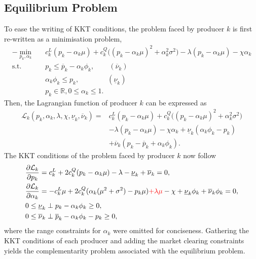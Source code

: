 \documentclass{article}
\begin{document}
\subsection*{Equilibrium Problem}
To ease the writing of KKT conditions, the problem faced by producer $k$ is first re-written as a minimisation problem,
\begin{align}
-\underset{p_k, \alpha_k}{\min} \hspace{10pt} & c_k^L(p_k - \alpha_k \mu) + c_k^Q \big((p_k - \alpha_k \mu)^2 + \alpha_k^2 \sigma^2\big) - \lambda (p_k - \alpha_k \mu) - \chi \alpha_k\\
\mbox{s.t. } & p_k \le \overline{p}_k - \alpha_k \phi_k, \hspace{25pt} (\overline{\nu}_k)\\
& \alpha_k \phi_k \le p_k, \hspace{48pt}(\underline{\nu}_k)\\
&p_k \in \mathbb{R}, 0 \le \alpha_k \le 1.
\end{align}
Then, the Lagrangian function of producer $k$ can be expressed as
\begin{align*}
\mathcal{L}_k(p_k, \alpha_k, \lambda, \chi, \underline{\nu}_k, \overline{\nu}_k) =& c_k^L(p_k - \alpha_k \mu) + c_k^Q \big((p_k - \alpha_k \mu)^2 + \alpha_k^2 \sigma^2\big)\\
&- \lambda (p_k - \alpha_k \mu) - \chi \alpha_k + \underline{\nu}_k(\alpha_k \phi_k - p_k)\\
&+ \overline{\nu}_k (p_k - \overline{p}_k + \alpha_k \phi_k).
\end{align*}
The KKT conditions of the problem faced by producer $k$ now follow
\begin{align*}
&\frac{\partial \mathcal{L}_k}{\partial p_k} = c_k^L + 2 c_k^Q (p_k - \alpha_k \mu) - \lambda - \underline{\nu}_k + \overline{\nu}_k = 0,\\
&\frac{\partial \mathcal{L}_k}{\partial \alpha_k} = - c_k^L \mu + 2 c_k^Q(\alpha_k(\mu^2 + \sigma^2) - p_k \mu) \textcolor{red}{+ \lambda \mu} - \chi + \underline{\nu}_k \phi_k + \overline{\nu}_k \phi_k = 0,\\
&0 \le \underline{\nu}_k \perp p_k - \alpha_k \phi_k \ge 0,\\
&0 \le \overline{\nu}_k \perp \overline{p}_k - \alpha_k \phi_k - p_k \ge 0,
\end{align*}
where the range constraints for $\alpha_k$ were omitted for conciseness. Gathering the KKT conditions of each producer and adding the market clearing constraints yields the complementarity problem associated with the equilibrium problem.
\end{document}
